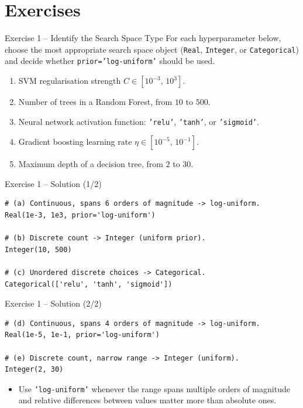 \documentclass{beamer}
\begin{document}
\section{Exercises}

\begin{frame}{Exercise 1 -- Identify the Search Space Type}
  For each hyperparameter below, choose the most appropriate search space object (\texttt{Real}, \texttt{Integer}, or \texttt{Categorical}) and decide whether \texttt{prior='log-uniform'} should be used.
  \begin{enumerate}
    \item[(a)] SVM regularisation strength \(C \in [10^{-3},\, 10^{3}]\).
    \item[(b)] Number of trees in a Random Forest, from \(10\) to \(500\).
    \item[(c)] Neural network activation function: \texttt{'relu'}, \texttt{'tanh'}, or \texttt{'sigmoid'}.
    \item[(d)] Gradient boosting learning rate \(\eta \in [10^{-5},\, 10^{-1}]\).
    \item[(e)] Maximum depth of a decision tree, from \(2\) to \(30\).
  \end{enumerate}
\end{frame}

\begin{frame}[fragile]{Exercise 1 -- Solution (1/2)}
  \begin{lstlisting}
# (a) Continuous, spans 6 orders of magnitude -> log-uniform.
Real(1e-3, 1e3, prior='log-uniform')

# (b) Discrete count -> Integer (uniform prior).
Integer(10, 500)

# (c) Unordered discrete choices -> Categorical.
Categorical(['relu', 'tanh', 'sigmoid'])
  \end{lstlisting}
\end{frame}

\begin{frame}[fragile]{Exercise 1 -- Solution (2/2)}
  \begin{lstlisting}
# (d) Continuous, spans 4 orders of magnitude -> log-uniform.
Real(1e-5, 1e-1, prior='log-uniform')

# (e) Discrete count, narrow range -> Integer (uniform).
Integer(2, 30)
  \end{lstlisting}
  \begin{itemize}
    \item Use \texttt{'log-uniform'} whenever the range spans multiple orders of magnitude and relative differences between values matter more than absolute ones.
  \end{itemize}
\end{frame}
\end{document}
